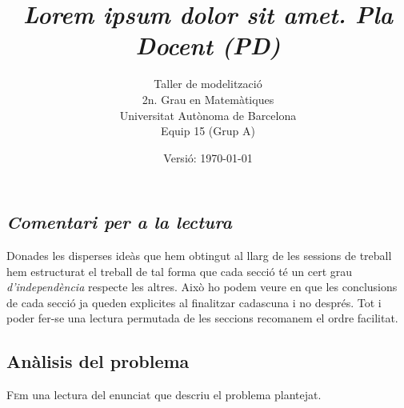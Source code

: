 \documentclass[10pt,twocolumn]{article}
\title{\emph{\color{redviolet!75!black} Lorem ipsum dolor sit amet.  Pla Docent {(PD)}}}
\author{ Taller de modelització \\ 2n. Grau en  Matemàtiques \\ Universitat Autònoma de Barcelona \\ Equip 15 (Grup A)\\ }
\date{Versió: \today}
\begin{document}
\tableofcontents
\vspace{5mm}
\begin{tcolorbox}[colframe=white,colback=redviolet!20,sharp corners=all,size=minimal,halign=center,valign=center]
	\section{\textit{Comentari per a la lectura}}
\end{tcolorbox}
\lettrine{D}onades les disperses ideàs que hem obtingut al llarg de les sessions de treball hem estructurat el treball de tal forma que cada secció té un cert grau \textit{d'independència} respecte les altres. Això ho podem veure en que les conclusions de cada secció ja queden explicites al finalitzar cadascuna i no després. Tot i poder fer-se una lectura permutada de les seccions recomanem el ordre facilitat. 
\\ 
\newpage
\begin{tcolorbox}[colframe=white,colback=redviolet!20,sharp corners=all,size=minimal,halign=center,valign=center]
\section{Anàlisis del problema}
\end{tcolorbox}
\lettrine{F}em una lectura del enunciat que descriu el problema plantejat. 

\vspace{5mm}
\end{document}

